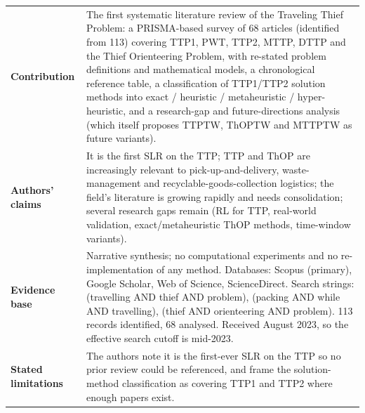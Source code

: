 \documentclass[
  a4paper,
  11pt,
  headings=small,
  numbers=noenddot,
  abstract=on,
  parskip=half,
]{scrartcl}
\begin{document}
\begin{landscape}
\begin{longtable}{@{}p{2.6cm}p{8.7cm}p{2.6cm}p{8.7cm}@{}}
\textbf{Contribution} & \multicolumn{3}{p{20.0cm}}{The first systematic literature review of the Traveling Thief Problem: a PRISMA-based survey of 68 articles (identified from 113) covering TTP1, PWT, TTP2, MTTP, DTTP and the Thief Orienteering Problem, with re-stated problem definitions and mathematical models, a chronological reference table, a classification of TTP1/TTP2 solution methods into exact / heuristic / metaheuristic / hyper-heuristic, and a research-gap and future-directions analysis (which itself proposes TTPTW, ThOPTW and MTTPTW as future variants).} \\
\textbf{Authors' claims} & \multicolumn{3}{p{20.0cm}}{It is the first SLR on the TTP; TTP and ThOP are increasingly relevant to pick-up-and-delivery, waste-management and recyclable-goods-collection logistics; the field's literature is growing rapidly and needs consolidation; several research gaps remain (RL for TTP, real-world validation, exact/metaheuristic ThOP methods, time-window variants).} \\
\textbf{Evidence base} & \multicolumn{3}{p{20.0cm}}{Narrative synthesis; no computational experiments and no re-implementation of any method. Databases: Scopus (primary), Google Scholar, Web of Science, ScienceDirect. Search strings: (travelling AND thief AND problem), (packing AND while AND travelling), (thief AND orienteering AND problem). 113 records identified, 68 analysed. Received August 2023, so the effective search cutoff is mid-2023.} \\
\textbf{Stated limitations} & \multicolumn{3}{p{20.0cm}}{The authors note it is the first-ever SLR on the TTP so no prior review could be referenced, and frame the solution-method classification as covering TTP1 and TTP2 where enough papers exist.} \\

\end{longtable}
\end{landscape}
\end{document}

